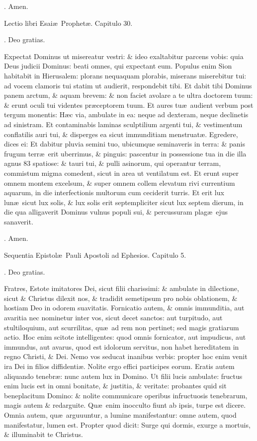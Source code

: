 \documentclass[letter,11pt]{book}
\makeatletter
\DeclareRobustCommand{\Rbar}{\vers@resp{0pt}{R}}
\newcommand{\vers@resp@sym}{\raisebox{0.2ex}{\rotatebox[origin=c]{-20}{$\m@th\rceil$}}}
\newcommand{\vers@resp}[2]{%
  {\ooalign{\hidewidth\kern#1\vers@resp@sym\hidewidth\cr#2\cr}}%
}%
\def\R{\color{Red} \Rbar . \color{black}}
\makeatother
\begin{document}
\begin{multicols*}{2}
\R Amen.

Lectio libri Esai\ae \ Prophet\ae . Capitulo 30.

\R Deo gratias.

Expectat Dominus ut misereatur vestri: \& ideo exaltabitur parcens vobis: quia Deus judicii Dominus: beati omnes, qui expectant eum. Populus enim Sion habitabit in Hierusalem: plorans nequaquam plorabis, miserans miserebitur tui: ad vocem clamoris tui statim ut audierit, respondebit tibi. Et dabit tibi Dominus panem arctum, \& aquam brevem: \& non faciet avolare a te ultra doctorem tuum: \& erunt oculi tui videntes pr\ae ceptorem tuum. Et aures tu\ae \ audient verbum post tergum monentis: H\ae c via, ambulate in ea: neque ad dexteram, neque declinetis ad sinistram. Et contaminabis laminas sculptilium argenti tui, \& vestimentum conflatilis auri tui, \& disperges ea sicut immunditiam menstruat\ae . Egredere, dices ei: Et dabitur pluvia semini tuo, ubicumque seminaveris in terra: \& panis frugum terr\ae \ erit uberrimus, \& pinguis: pascentur in possessione tua in die illa agnus 83 spatiose: \& tauri tui, \& pulli asinorum, qui operantur terram, commistum migma comedent, sicut in area ut ventilatum est. Et erunt super omnem montem excelsum, \& super omnem collem elevatum rivi currentium aquarum, in die interfectionis multorum cum ceciderit turris. Et erit lux lun\ae \ sicut lux solis, \& lux solis erit septempliciter sicut lux septem dierum, in die qua alligaverit Dominus vulnus populi sui, \& percussuram plag\ae \ ejus sanaverit.

\R Amen.

Sequentia Epistol\ae \ Pauli Apostoli ad Ephesios. Capitulo 5.

\R Deo gratias.

Fratres, Estote imitatores Dei, sicut filii charissimi: \& ambulate in dilectione, sicut \& Christus dilexit nos, \& tradidit semetipsum pro nobis oblationem, \& hostiam Deo in odorem suavitatis. Fornicatio autem, \& omnis immunditia, aut avaritia nec nominetur inter vos, sicut decet sanctos: aut turpitudo, aut stultiloquium, aut scurrilitas, qu\ae \ ad rem non pertinet; sed magis gratiarum actio. Hoc enim scitote intelligentes: quod omnis fornicator, aut impudicus, aut immundus, aut avarus, quod est idolorum servitus, non habet hereditatem in regno Christi, \& Dei. Nemo vos seducat inanibus verbis: propter hoc enim venit ira Dei in filios diffidenti\ae . Nolite ergo effici participes eorum. Eratis autem aliquando tenebr\ae : nunc autem lux in Domino. Ut filii lucis ambulate: fructus enim lucis est in omni bonitate, \& justitia, \& veritate: probantes quid sit beneplacitum Domino: \& nolite communicare operibus infructuosis tenebrarum, magis autem \& redarguite. Qu\ae \ enim inocculto fiunt ab ipsis, turpe est dicere. Omnia autem, qu\ae \ arguuuntur, a lumine manifestantur: omne autem, quod manifestatur, lumen est. Propter quod dicit: Surge qui dormis, exurge a mortuis, \& illuminabit te Christus.


\end{multicols*}
\end{document}
